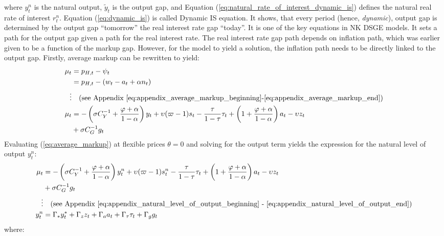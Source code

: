 where $y^n_{t}$ is the natural output, $\tilde{y}_t$ is the output gap, and Equation (\ref{eq:natural_rate_of_interest_dynamic_is}) defines the natural real rate of interest $r_t^n$. Equation (\ref{eq:dynamic_is}) is called Dynamic IS equation. It shows, that every period (hence, \textit{dynamic}), output gap is determined by the output gap ``tomorrow'' the real interest rate gap ``today''. It is one of the key equations in NK DSGE models. It sets a path for the output gap given a path for the real interest rate. The real interest rate gap path depends on inflation path, which was earlier given to be a function of the markup gap. However, for the model to yield a solution, the inflation path needs to be directly linked to the output gap. Firstly, average markup can be rewritten to yield:
\begin{align}
    \mu_t &= p_{H,t} - \psi_t \\
     &= p_{H,t} - (w_t - a_t + \alpha n_t) \nonumber \\
    \vdots & \quad \text{(see Appendix \ref{eq:appendix_average_markup_beginning}-\ref{eq:appendix_average_markup_end})} \nonumber \\
    \mu_t &= -\left(\sigma C_Y^{-1} + \frac{\varphi + \alpha}{1-\alpha}\right)y_t + \upsilon (\varpi - 1) s_t - \frac{\tau}{1-\tau}\tau_t  + \left(1 + \frac{\varphi + \alpha}{1-\alpha}\right)a_t - \upsilon z_t \nonumber \\ 
    &+ \sigma C_G^{-1} g_t  \label{eq:average_markup}
\end{align}
Evaluating (\ref{eq:average_markup}) at flexible prices $\theta=0$ and solving for the output term yields the expression for the natural level of output $y_t^n$:
\begin{align}
    \mu_t &= -\left(\sigma C_Y^{-1} + \frac{\varphi + \alpha}{1-\alpha}\right)y^n_t + \upsilon (\varpi - 1) s^n_t - \frac{\tau}{1-\tau}\tau_t  + \left(1 + \frac{\varphi + \alpha}{1-\alpha}\right)a_t - \upsilon z_t \nonumber \\ 
    &+ \sigma C_G^{-1} g_t \label{eq:average_markup_flexible_prices}\\
    \vdots & \quad \text{(see Appendix \ref{eq:appendix_natural_level_of_output_beginning} - \ref{eq:appendix_natural_level_of_output_end})} \nonumber \\
    y^n_t &= \Gamma_* y^*_t + \Gamma_z z_t + \Gamma_a a_t + \Gamma_\tau \tau_t + \Gamma_g g_t \label{eq:natural_output}
\end{align}
where:
